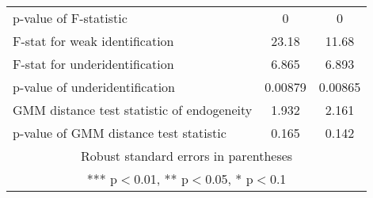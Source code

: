 \documentclass[]{article}
\begin{document}
\begin{tabular}{lcc}
p-value of F-statistic & 0 & 0 \\
F-stat for weak identification & 23.18 & 11.68 \\
F-stat for underidentification & 6.865 & 6.893 \\
p-value of underidentification & 0.00879 & 0.00865 \\
GMM distance test statistic of endogeneity & 1.932 & 2.161 \\
 p-value of GMM distance test statistic & 0.165 & 0.142 \\ \hline
\multicolumn{3}{c}{ Robust standard errors in parentheses} \\
\multicolumn{3}{c}{ *** p$<$0.01, ** p$<$0.05, * p$<$0.1} \\
\end{tabular}
\end{document}
